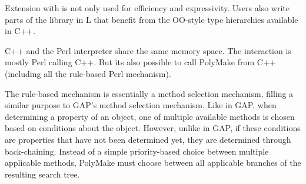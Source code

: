 Extension with is not only used for efficiency and expressivity.
Users also write parts of the library in L that benefit from the OO-style type hierarchies available in C++.

C++ and the Perl interpreter share the same memory space.
The interaction is mostly Perl calling C++.
But its also possible to call PolyMake from C++ (including all the rule-based Perl mechanism).

The rule-based mechanism is essentially a method selection mechanism, filling a similar purpose to GAP's method selection mechanism.
Like in GAP, when determining a property of an object, one of multiple available methods is chosen based on conditions about the object.
However, unlike in GAP, if these conditions are properties that have not been determined yet, they are determined through back-chaining.
Instead of a simple priority-based choice between multiple applicable methods, PolyMake must choose between all applicable branches of the resulting search tree.
